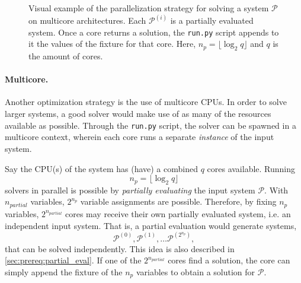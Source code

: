 \begin{figure}[t]
    \centering
    \caption{Visual example of the parallelization strategy for solving a system $\mathcal{P}$ on multicore architectures. Each $\mathcal{P}^{(i)}$ is a partially evaluated system. Once a core returns a solution, the \texttt{run.py} script appends to it the values of the fixture for that core. Here, $n_{p} = \lfloor \log_2 q \rfloor$ and $q$ is the amount of cores.} \label{fig:multicore_visual}
\end{figure}

\paragraph{Multicore.} Another optimization strategy is the use of multicore CPUs. In order to solve larger systems, a good solver would make use of as many of the resources available as possible. Through the \texttt{run.py} script, the solver can be spawned in a multicore context, wherein each core runs a separate \textit{instance} of the input system.

Say the CPU(s) of the system has (have) a combined $q$ cores available. Running 
$$
    n_{p} = \lfloor \log_2 q \rfloor
$$ 
solvers in parallel is possible by \textit{partially evaluating} the input system $\mathcal{P}$. With $n_{partial}$ variables, $2^{n_{p}}$ variable assignments are possible. Therefore, by fixing $n_{p}$ variables, $2^{n_{partial}}$ cores may receive their own partially evaluated system, i.e. an independent input system. That is, a partial evaluation would generate systems,
$$
    \mathcal{P}^{(0)}, \mathcal{P}^{(1)}, \dots \mathcal{P}^{(2^{n_{p}})},
$$
that can be solved independently. This idea is also described in \cref{sec:prereq:partial_eval}. If one of the $2^{n_{partial}}$ cores find a solution, the core can simply append the fixture of the $n_{p}$ variables to obtain a solution for $\mathcal{P}$.


